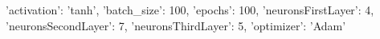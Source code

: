 {'activation': 'tanh', 'batch_size': 100, 'epochs': 100, 'neuronsFirstLayer': 4, 'neuronsSecondLayer': 7, 'neuronsThirdLayer': 5, 'optimizer': 'Adam'}